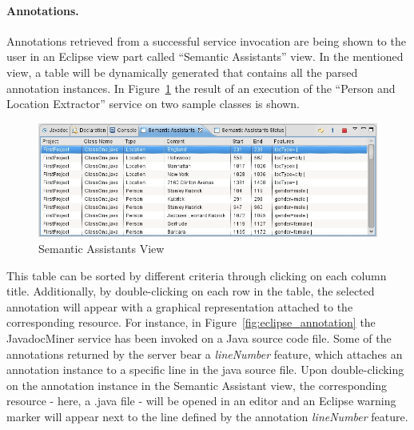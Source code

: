 \paragraph{Annotations.}
Annotations retrieved from a successful service invocation are being shown to the user in an
Eclipse view part called ``Semantic Assistants'' view. In the mentioned view, a
table will be dynamically generated that contains
all the parsed annotation instances. In Figure~\ref{fig:eclipse_saView} the
result of an execution of the ``Person and Location Extractor'' service on two
sample classes is shown.
\begin{figure}[htb]
\begin{center}
  \includegraphics[width=1\textwidth]{pictures/eclipse_saView.jpg}
  \caption{Semantic Assistants View}
  \label{fig:eclipse_saView}
\end{center}
\end{figure}

This table can be sorted by different criteria through clicking on each column
title. Additionally, by double-clicking on each row in the table, the selected
annotation will appear with a graphical representation attached to the
corresponding resource. For instance, in Figure~\ref{fig:eclipse_annotation} the
JavadocMiner service has been invoked on a Java source code file. Some of the
annotations returned by the server bear a \emph{lineNumber} feature, which
attaches an annotation instance to a specific line in the java source file. Upon
double-clicking on the annotation instance in the Semantic Assistant view, the
corresponding resource - here, a .java file - will be opened in an editor and an
Eclipse warning marker will appear next to the line defined by the annotation
\emph{lineNumber} feature.

